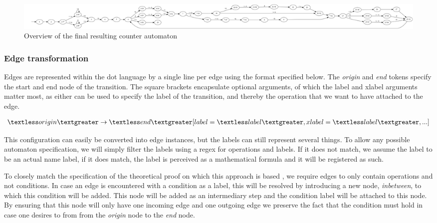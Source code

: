 \documentclass[12pt]{article}
\begin{document}
\begin{landscape}
	\begin{figure}
		\centering
		\includegraphics[width=\linewidth]{final_overview_11}
		\caption{Overview of the final resulting counter automaton}
		\label{fig:final_overview_11}
	\end{figure}
\end{landscape}

\subsubsection{Edge transformation}
Edges are represented within the dot language by a single line per edge using the format specified below. The \textit{origin} and \textit{end} tokens specify the start and end node of the transition. The square brackets encapsulate optional arguments, of which the label and xlabel arguments matter most, as either can be used to specify the label of the transition, and thereby the operation that we want to have attached to the edge. 

\begin{gather*}
	\textless origin \textgreater \rightarrow \textless end\textgreater [label=\textless label\textgreater, xlabel=\textless label\textgreater, ...]
\end{gather*}

This configuration can easily be converted into edge instances, but the labels can still represent several things. To allow any possible automaton specification, we will simply filter the labels using a regex for operations and labels. If it does not match, we assume the label to be an actual name label, if it does match, the label is perceived as a mathematical formula and it will be registered as such. 

To closely match the specification of the theoretical proof on which this approach is based \cite{blondin2021continuous}, we require edges to only contain operations and not conditions. In case an edge is encountered with a condition as a label, this will be resolved by introducing a new node, \textit{inbetween}, to which this condition will be added. This node will be added as an intermediary step and the condition label will be attached to this node. By ensuring that this node will only have one incoming edge and one outgoing edge we preserve the fact that the condition must hold in case one desires to from from the \textit{origin} node to the \textit{end} node. 
\end{document}
